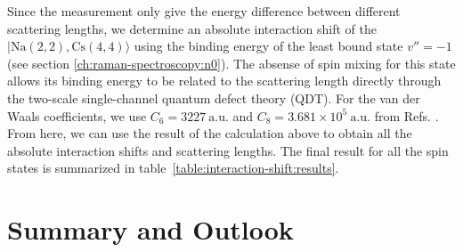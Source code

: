 Since the measurement only give the energy difference between different scattering lengths,
we determine an absolute interaction shift of the $|\mathrm{Na(2, 2),Cs(4, 4)}\rangle$
using the binding energy of the least bound state $v''=-1$
(see section \ref{ch:raman-spectroscopy:n0}).
The absense of spin mixing for this state allows its binding energy to be related
to the scattering length directly through
the two-scale single-channel quantum defect theory (QDT).
For the van der Waals coefficients, we use $C_6=3227~\mathrm{a.u.}$ and
$C_8=3.681\times10^5~\mathrm{a.u.}$ from
Refs. \cite{docenko_coupling_2006,mcguyer_high-precision_2015,porsev_accurate_2003}.
From here, we can use the result of the calculation above to obtain all the
absolute interaction shifts and scattering lengths.
The final result for all the spin states is summarized in
table~\ref{table:interaction-shift:results}.

\section{Summary and Outlook}

